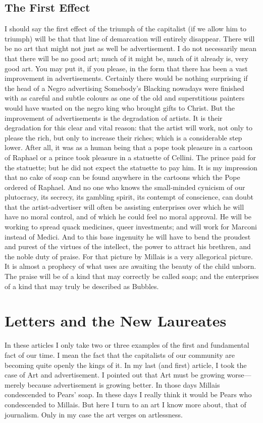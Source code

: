 \documentclass{book}
\begin{document}
\section{The First Effect}
I should say the first effect of the triumph of the capitalist (if we allow him to triumph) will be that that line of demarcation will entirely disappear. There will be no art that might not just as well be advertisement. I do not necessarily mean that there will be no good art; much of it might be, much of it already is, very good art. You may put it, if you please, in the form that there has been a vast improvement in advertisements. Certainly there would be nothing surprising if the head of a Negro advertising Somebody’s Blacking nowadays were finished with as careful and subtle colours as one of the old and superstitious painters would have wasted on the negro king who brought gifts to Christ. But the improvement of advertisements is the degradation of artists. It is their degradation for this clear and vital reason: that the artist will work, not only to please the rich, but only to increase their riches; which is a considerable step lower. After all, it was as a human being that a pope took pleasure in a cartoon of Raphael or a prince took pleasure in a statuette of Cellini. The prince paid for the statuette; but he did not expect the statuette to pay him. It is my impression that no cake of soap can be found anywhere in the cartoons which the Pope ordered of Raphael. And no one who knows the small-minded cynicism of our plutocracy, its secrecy, its gambling spirit, its contempt of conscience, can doubt that the artist-advertiser will often be assisting enterprises over which he will have no moral control, and of which he could feel no moral approval. He will be working to spread quack medicines, queer investments; and will work for Marconi instead of Medici. And to this base ingenuity he will have to bend the proudest and purest of the virtues of the intellect, the power to attract his brethren, and the noble duty of praise. For that picture by Millais is a very allegorical picture. It is almost a prophecy of what uses are awaiting the beauty of the child unborn. The praise will be of a kind that may correctly be called soap; and the enterprises of a kind that may truly be described as Bubbles.

\chapter{Letters and the New Laureates}
\label{chapter-1}
In these articles I only take two or three examples of the first and fundamental fact of our time. I mean the fact that the capitalists of our community are becoming quite openly the kings of it. In my last (and first) article, I took the case of Art and advertisement. I pointed out that Art must be growing worse—merely because advertisement is growing better. In those days Millais condescended to Pears’ soap. In these days I really think it would be Pears who condescended to Millais. But here I turn to an art I know more about, that of journalism. Only in my case the art verges on artlessness.
\end{document}
